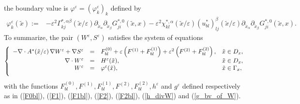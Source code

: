 \documentclass[11pt, reqno]{amsart}
\theoremstyle{definition}
\theoremstyle{remark}
\numberwithin{equation}{section}
\begin{document}
	the boundary value is $\varphi^\varepsilon = (\varphi^\varepsilon_{k})_k$ defined by	\begin{align}
		\varphi_k^{\varepsilon}(\tilde{x}):=
		& - \varepsilon^2 \Gamma^{*,\alpha\beta}_{kj}(\tilde{x}/\varepsilon)\partial_{ \tilde{x}_{\alpha}}\partial_{\tilde{x}_{\beta}} G_{ji}^{*,0}  (\tilde{x},x) - \varepsilon^2	\chi^{*,\alpha}_{kl}(\tilde{x}/\varepsilon)(u^*_{bl})^{\beta}_{lj}	(\tilde{x}/\varepsilon)\partial_{ \tilde{x}_{\alpha}}\partial_{\tilde{x}_{\beta}}G_{ji}^{*,0}  (\tilde{x},x).\label{g_bv_of_W}
	\end{align}
	To summarize, 		the pair $ (W^{\varepsilon}\!, S^{\varepsilon}) $ satisfies the system of equations
	\begin{equation}
		\label{Pb_WS}	\left\{
		\begin{array}{rcll}
			-\nabla\cdot A^* (\tilde{x}/\varepsilon) \, \nabla W^{\varepsilon}  +  \nabla S^{\varepsilon}&=&F^{(0)}_{bl}+ \varepsilon\left( F^{(1)}+ F^{(1)}_{bl} \right)  +\varepsilon^2 \left(F^{(2)}+F^{(2)}_{bl}\right),   &\tilde{x}\in D_x,\\ 
			\nabla \cdot W^{\varepsilon} &=& H^\varepsilon (\tilde{x})  ,&\tilde{x}\in D_x,\\ \vspace{0.1in} 
			W^{\varepsilon}&=& \varphi^\varepsilon(\tilde{x}),&\tilde{x}\in \Gamma_x,
		\end{array}
		\right. 
	\end{equation}	
	with the functions $ F^{(0)}_{bl}, F^{(1)}, F^{(1)}_{bl} ,F^{(2)}, F^{(2)}_{bl},  h^\varepsilon$ and $g^\varepsilon$  defined respectively  as in (\ref{F0bl}), (\ref{F1}), (\ref{F1bl}), (\ref{F2}), (\ref{F2bl}), (\ref{h_divW}) and (\ref{g_bv_of_W}).\\
	
	
	
\end{document}
